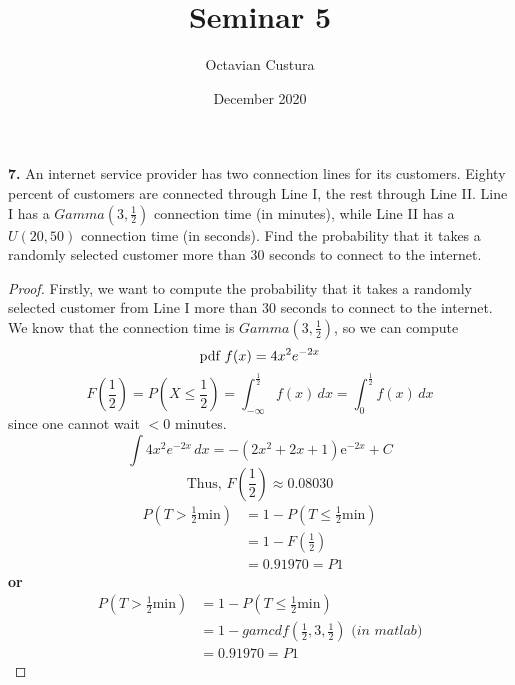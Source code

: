 \documentclass{article}
\title{Seminar 5}
\author{Octavian Custura}
\date{December 2020}
\begin{document}
\maketitle

\textbf{7.} An internet service provider has two connection lines for its customers. Eighty percent of customers are
connected through Line I, the rest through Line II. Line I has a $Gamma(3, \frac{1}{2})$ connection time (in minutes),
while Line II has a $U(20, 50)$ connection time (in seconds). Find the probability that it takes a randomly selected
customer more than 30 seconds to connect to the internet.

\begin{proof}

Firstly, we want to compute the probability that it takes a randomly selected customer from Line I more than 30 seconds to connect to the internet. We know that the connection time is $Gamma(3, \frac{1}{2})$, so we can compute
\begin{equation*}
    \text{pdf } f(x) = 4{x}^{2}e^{-2x} \\
\end{equation*}
\begin{equation*}
        F(\frac{1}{2}) = P(X \leq \frac{1}{2}) = \int_{-\infty}^{\frac{1}{2}} f(x)\,dx = \int_{0}^{\frac{1}{2}} f(x)\,dx
\end{equation*}
since one cannot wait $< 0$ minutes.
\begin{equation*}
    \int 4{x}^{2}e^{-2x} \,dx = -\left(2x^2+2x+1\right)\mathrm{e}^{-2x} + C
\end{equation*}
\begin{equation*}
    \text{Thus, } F(\frac{1}{2}) \approx 0.08030
\end{equation*}
\begin{equation*}
    \begin{split}
    P(T > \frac{1}{2} \text{min}) &= 1 - P(T \leq \frac{1}{2} \text{min}) \\
    &= 1 - F(\frac{1}{2}) \\
    &= 0.91970 = P1
    \end{split}
\end{equation*}
\textbf{or}
\begin{equation}
\begin{split}
    P(T > \frac{1}{2} \text{min}) &= 1 - P(T \leq \frac{1}{2} \text{min}) \\
    &= 1 - gamcdf(\frac{1}{2}, 3, \frac{1}{2}) \textit{ (in matlab)} \\
    &= 0.91970 = P1
\end{split}
\end{equation}


\end{proof}
\end{document}
